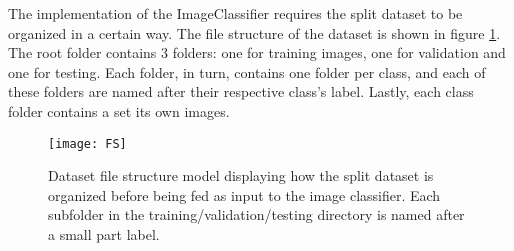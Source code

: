 The implementation of the ImageClassifier requires the split dataset to be organized in a certain way. The file structure of the dataset is shown in figure \ref{fig:FS}. The root folder contains 3 folders: one for training images, one for validation and one for testing. Each folder, in turn, contains one folder per class, and each of these folders are named after their respective class's label. Lastly, each class folder contains a set its own images.

\begin{figure}[H]
\centering
  \texttt{[image: FS]}
\caption{Dataset file structure model displaying how the split dataset is organized before being fed as input to the image classifier. Each subfolder in the training/validation/testing directory is named after a small part label.}
\label{fig:FS}
\end{figure}
